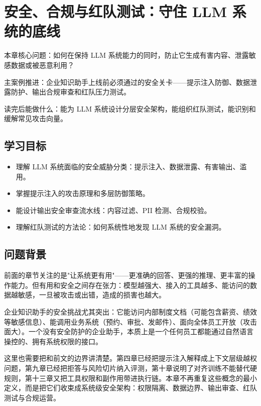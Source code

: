 \chapter{安全、合规与红队测试：守住 LLM 系统的底线}

\begin{introduction}
\item {\heiti 本章核心问题}：如何在保持 LLM 系统能力的同时，防止它生成有害内容、泄露敏感数据或被恶意利用？
\item {\heiti 主案例推进}：企业知识助手上线前必须通过的安全关卡——提示注入防御、数据泄露防护、输出合规审查和红队压力测试。
\item {\heiti 读完后能做什么}：能为 LLM 系统设计分层安全架构，能组织红队测试，能识别和缓解常见攻击向量。
\end{introduction}

\section{学习目标}
\begin{itemize}
  \item 理解 LLM 系统面临的安全威胁分类：提示注入、数据泄露、有害输出、滥用。
  \item 掌握提示注入的攻击原理和多层防御策略。
  \item 能设计输出安全审查流水线：内容过滤、PII 检测、合规校验。
  \item 理解红队测试的方法论：如何系统性地发现 LLM 系统的安全漏洞。
\end{itemize}

\section{问题背景}
前面的章节关注的是"让系统更有用"——更准确的回答、更强的推理、更丰富的操作能力。但有用和安全之间存在张力：模型越强大、接入的工具越多、能访问的数据越敏感，一旦被攻击或出错，造成的损害也越大。

企业知识助手的安全挑战尤其突出：它能访问内部制度文档（可能包含薪资、绩效等敏感信息）、能调用业务系统（预约、审批、发邮件）、面向全体员工开放（攻击面大）。一个没有安全防护的企业助手，本质上是一个任何员工都能通过自然语言操控的、拥有系统权限的接口。

这里也需要把和前文的边界讲清楚。第四章已经把提示注入解释成上下文层级越权问题，第九章已经把拒答与风险切片纳入评测，第十章说明了对齐训练不能替代硬规则，第十三章又把工具权限和副作用带进执行链。本章不再重复这些概念的最小定义，而是把它们收束成{\heiti 系统级安全架构}：权限隔离、数据边界、输出审查、红队测试与合规运营。

